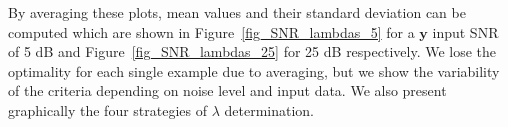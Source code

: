 \documentclass[]{elsarticle} %
\begin{document}
By averaging these plots, mean values and their standard deviation can be computed which are shown in Figure~\ref{fig_SNR_lambdas_5} for a $\textbf{y}$ input SNR of 5 dB and Figure~\ref{fig_SNR_lambdas_25} for 25 dB respectively. We lose the optimality for each single example due to averaging, but we show the variability of the criteria depending on noise level and input data. We also present graphically the four strategies of $\lambda$ determination.
\begin{figure}[H]
    \centering

\end{figure}
\end{document}

